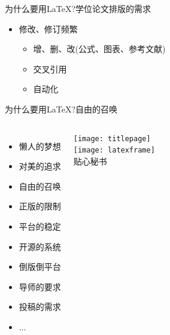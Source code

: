 \documentclass[xcolor=svgnames, t, 10pt]{ctexbeamer}%
\begin{document}
\begin{frame}{为什么要用\LaTeX?}{学位论文排版的需求}
\begin{itemize}
\begin{itemize}
    \item 硕士：约30000$\sim$50000字，50$\sim$80页(A4)
    \item 博士：字数100000+，100$\sim$150页(A4)
    \end{itemize}  
  \item 修改、修订\alert{频繁}
    \begin{itemize}
    \item 增、删、改(公式、图表、参考文献)
    \item 交叉引用
    \item \alert{自动化}
    \end{itemize}  
  \end{itemize}
  \stretchoff
\end{frame}

\begin{frame}{为什么要用\LaTeX?}{自由的召唤}
  \begin{columns}[c]
    \begin{itemize} \setlength\itemsep{1em}
    \item \alert{懒人}的梦想
    \item 对\alert{美}的追求
    \item \alert{自由}的召唤
    \item \alert{正版}的限制
    \item 平台的\alert{稳定}
    \item \alert{开源}的系统
    \item \alert{倒版倒平台}
    \item \alert{导师}的要求
    \item \alert{投稿}的需求
    \item $\ldots$\hphantom{倒版倒a}%
    \end{itemize}
    \begin{center}
      \texttt{[image: titlepage]}\\
      \texttt{[image: latexframe]}\\%
      贴心\alert{秘书}
    \end{center}
  \end{columns}
\end{frame}
\end{document}
